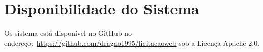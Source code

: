 %
%
%
%
%
%
%
%
%
%
%
%
%


\section{Disponibilidade do Sistema}

Os sistema está disponível no GitHub no endereço:~\url{https://github.com/dragao1995/licitacaoweb} sob a Licença Apache 2.0.



